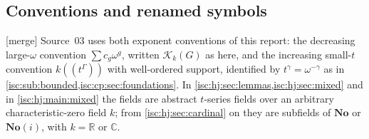 \documentclass[11pt,letterpaper]{article}
\theoremstyle{definition}
\theoremstyle{remark}
\newcommand{\No}{\mathbf{No}}
\newcommand{\SC}{\No(i)}
\newcommand{\R}{\mathbb R}
\newcommand{\C}{\mathbb C}
\newcommand{\K}[2]{\mathcal K_{#1}(#2)}
\newcommand{\mtag}{\textup{[merge]}}%
\numberwithin{equation}{section}
\begin{document}
\subsection{Conventions and renamed symbols}
\label{isc:hj:sec:conventions}

\mtag{} Source~03 uses both exponent conventions of this report: the
decreasing large-$\omega$ convention $\sum c_g\omega^g$, written $\K{k}{G}$
as here, and the increasing small-$t$ convention $k((t^\Gamma))$ with
well-ordered support, identified by $t^\gamma=\omega^{-\gamma}$ as in
\cref{isc:sub:bounded,isc:cp:sec:foundations}. In
\cref{isc:hj:sec:lemmas,isc:hj:sec:mixed} and in \cref{isc:hj:main:mixed}
the fields are abstract $t$-series fields over an arbitrary
characteristic-zero field $k$; from \cref{isc:hj:sec:cardinal} on they are
subfields of $\No$ or $\SC$, with $k=\R$ or $\C$.
\end{document}
